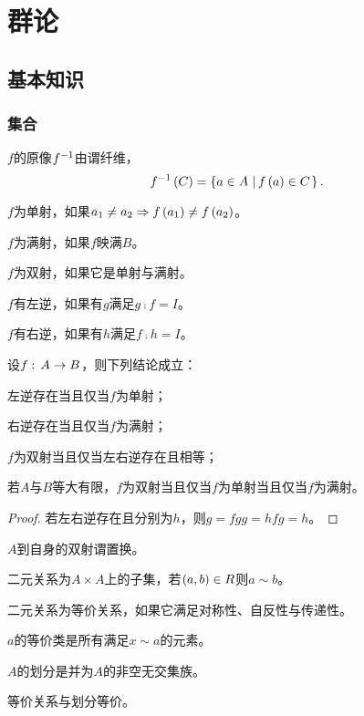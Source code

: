 \documentclass{ctexrep}
\begin{document}
\chapter{群论}
\section{基本知识}
\subsection{集合}
\begin{definition}
  $f$的原像$f^{-1}$由谓纤维，
  \[ f^{-1}\left(C\right) = \left\{a\in A \, \left| \, f\left(a\right)\in C \right.\right\}. \]
\end{definition}
\begin{definition}
  $f$为单射，如果$a_1\neq a_2 \Rightarrow f\left(a_1\right)\neq f\left(a_2\right)$。
\end{definition}
\begin{definition}
  $f$为满射，如果$f$映满$B$。
\end{definition}
\begin{definition}
  $f$为双射，如果它是单射与满射。
\end{definition}
\begin{definition}
  $f$有左逆，如果有$g$满足$g\comp f = I$。
\end{definition}
\begin{definition}
  $f$有右逆，如果有$h$满足$f\comp h = I$。
\end{definition}
\begin{theorem}
设$f:\, A \rightarrow B$，则下列结论成立：
\begin{cenum}
\item 左逆存在当且仅当$f$为单射；
\item 右逆存在当且仅当$f$为满射；
\item $f$为双射当且仅当左右逆存在且相等；
\item 若$A$与$B$等大有限，$f$为双射当且仅当$f$为单射当且仅当$f$为满射。
\end{cenum}
\end{theorem}
\begin{proof}
若左右逆存在且分别为$h$，则$g=fgg=hfg=h$。
\end{proof}
\begin{definition}
$A$到自身的双射谓置换。
\end{definition}
\begin{definition}
二元关系为$A\times A$上的子集，若$\left(a,b\right)\in R$则$a\sim b$。
\end{definition}
\begin{definition}
二元关系为等价关系，如果它满足对称性、自反性与传递性。
\end{definition}
\begin{definition}
$a$的等价类是所有满足$x\sim a$的元素。
\end{definition}
\begin{definition}
$A$的划分是并为$A$的非空无交集族。
\end{definition}
\begin{theorem}
等价关系与划分等价。
\end{theorem}
\end{document}
